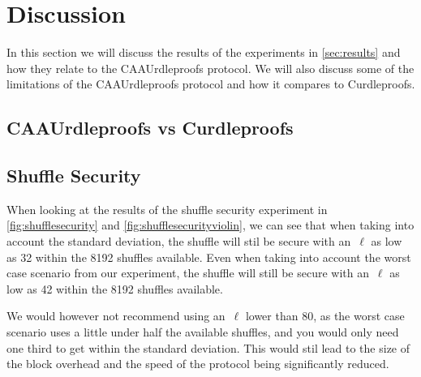 

\section{Discussion}\label{sec:discussion}
In this section we will discuss the results of the experiments in \autoref{sec:results} and how they relate to the CAAUrdleproofs protocol.
We will also discuss some of the limitations of the CAAUrdleproofs protocol and how it compares to Curdleproofs.


\subsection{CAAUrdleproofs vs Curdleproofs}\label{subsec:CAAUrdleproofs-vs-Curdleproofs}




\subsection{Shuffle Security}\label{subsec:Discution-Shuffle-security}
When looking at the results of the shuffle security experiment in \autoref{fig:shufflesecurity} and \autoref{fig:shufflesecurityviolin}, we can see that when taking into account the standard deviation, the shuffle will stil be secure with an~$\ell$ as low as 32 within the 8192 shuffles available.
Even when taking into account the worst case scenario from our experiment, the shuffle will still be secure with an~$\ell$ as low as 42 within the 8192 shuffles available.

We would however not recommend using an~$\ell$ lower than 80, as the worst case scenario uses a little under half the available shuffles, and you would only need one third to get within the standard deviation.
This would stil lead to the size of the block overhead and the speed of the protocol being significantly reduced.



